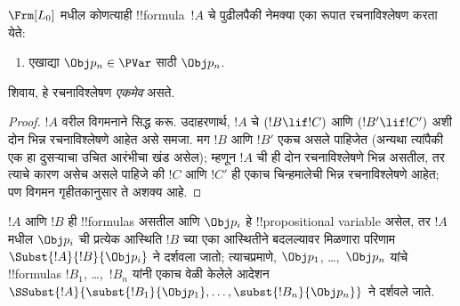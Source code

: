 \documentclass[../../../include/open-logic-section]{subfiles}
\begin{document}
\begin{prop}[एकमेव वाचनीयता]
$ \Frm[L_0]$ मधील कोणत्याही !!{formula}~$!A$ चे पुढीलपैकी नेमक्या एका
रूपात रचनाविश्लेषण करता येते:
\begin{enumerate}


\item एखाद्या $\Obj p_n \in  \PVar$ साठी $\Obj p_n$.
  




\end{enumerate}
शिवाय, हे रचनाविश्लेषण \emph{एकमेव} असते.
\end{prop}

\begin{proof}
$!A$ वरील विगमनाने सिद्ध करू. उदाहरणार्थ, $!A$ चे $(!B \lif !C)$ आणि
$(!B' \lif !C')$ अशी दोन भिन्न रचनाविश्लेषणे आहेत असे समजा. मग $!B$
आणि $!B'$ एकच असले पाहिजेत (अन्यथा त्यांपैकी एक हा दुसऱ्याचा उचित
आरंभीचा खंड असेल); म्हणून $!A$ ची ही दोन रचनाविश्लेषणे भिन्न असतील,
तर त्याचे कारण असेच असले पाहिजे की $!C$ आणि $!C'$ ही एकाच
चिन्हमालेची भिन्न रचनाविश्लेषणे आहेत; पण विगमन गृहीतकानुसार ते अशक्य
आहे.
\end{proof}


\begin{defn}[एकरूप आदेशन]
$!A$ आणि $!B$ ही !!{formula}s असतील आणि $\Obj p_i$ हे !!{propositional
variable} असेल, तर $!A$ मधील $\Obj p_i$ ची प्रत्येक
आस्थिति $!B$ च्या एका आस्थितीने बदलल्यावर मिळणारा परिणाम
$\Subst{!A}{!B}{\Obj p_i}$ ने दर्शवला जातो; त्याचप्रमाणे,
$\Obj p_1$, \dots,~$\Obj p_n$ यांचे !!{formula}s $!B_1$,
\dots,~$!B_n$ यांनी एकाच वेळी केलेले आदेशन
$\SSubst{!A}{\subst{!B_1}{\Obj p_1},\dots,\subst{!B_n}{\Obj p_n}}$
ने दर्शवले जाते.
\end{defn}
\end{document}
